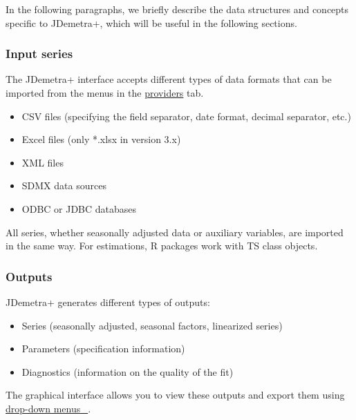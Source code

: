 \documentclass[
  letterpaper,
  DIV=11,
  numbers=noendperiod]{scrreprt}
\providecommand{\tightlist}{%
  \setlength{\itemsep}{0pt}\setlength{\parskip}{0pt}}\usepackage{longtable,booktabs,array}
\begin{document}
In the following paragraphs, we briefly describe the data structures and
concepts specific to JDemetra+, which will be useful in the following
sections.

\hypertarget{sec-concept-input}{%
\subsubsection*{Input series}\label{sec-concept-input}}

The JDemetra+ interface accepts different types of data formats that can
be imported from the menus in the
\href{https://doc.jdemetra.org/t-gui-overview\#providers-window}{providers}
tab.

\begin{itemize}
\tightlist
\item
  CSV files (specifying the field separator, date format, decimal
  separator, etc.)
\item
  Excel files (only *.xlsx in version 3.x)
\item
  XML files
\item
  SDMX data sources
\item
  ODBC or JDBC databases
\end{itemize}

All series, whether seasonally adjusted data or auxiliary variables, are
imported in the same way. For estimations, R packages work with TS class
objects.

\hypertarget{sec-concept-output}{%
\subsubsection*{Outputs}\label{sec-concept-output}}

JDemetra+ generates different types of outputs:

\begin{itemize}
\tightlist
\item
  Series (seasonally adjusted, seasonal factors, linearized series)
\item
  Parameters (specification information)
\item
  Diagnostics (information on the quality of the fit)
\end{itemize}

The graphical interface allows you to view these outputs and export them
using \href{https://doc.jdemetra.org/t-gui-output}{drop-down menus~🔗}.
\end{document}

